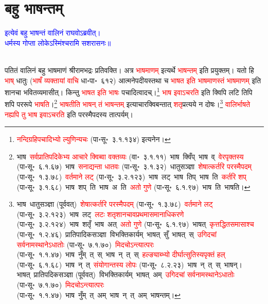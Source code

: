 \section[बहु भाषन्तम्]{बहु भाषन्तम्}
\centering\textcolor{blue}{इत्येवं बहु भाषन्तं वालिनं राघवोऽब्रवीत्।\nopagebreak\\
धर्मस्य गोप्ता लोकेऽस्मिंश्चरामि सशरासनः॥}\nopagebreak\\
\\
\begin{sloppypar}\justifying\noindent\hspace{10mm} पतितं वालिनं बहु भाषमाणं श्रीरामभद्रः प्रतिवक्ति। अत्र \textcolor{red}{भाषमाणम्} इत्यर्थे \textcolor{red}{भाषन्तम्} इति प्रयुक्तम्। यतो हि \textcolor{red}{भाष्} धातुः (\textcolor{red}{भाषँ व्यक्तायां वाचि} धा॰पा॰~६१२) आत्मनेपदीयस्तथा च \textcolor{red}{भाषत इति भाषमाणस्तं भाषमाणम्} इति शानचा भवितव्यमासीत्। किन्तु \textcolor{red}{भाषत इति भाषः} पचादित्वादच्।\footnote{\textcolor{red}{नन्दि\-ग्रहि\-पचादिभ्यो ल्युणिन्यचः} (पा॰सू॰~३.१.१३४) इत्यनेन।} \textcolor{red}{भाष इवाऽचरति}
इति क्विपि लटि तिपि शपि पररूपे \textcolor{red}{भाषति}।\footnote{भाष~\arrow \textcolor{red}{सर्वप्राति\-पदिकेभ्य आचारे क्विब्वा वक्तव्यः} (वा॰~३.१.११)~\arrow भाष~क्विँप्~\arrow भाष~व्~\arrow \textcolor{red}{वेरपृक्तस्य} (पा॰सू॰~६.१.६७)~\arrow भाष~\arrow \textcolor{red}{सनाद्यन्ता धातवः} (पा॰सू॰~३.१.३२)~\arrow धातुसञ्ज्ञा~\arrow \textcolor{red}{शेषात्कर्तरि परस्मैपदम्} (पा॰सू॰~१.३.७८)~\arrow \textcolor{red}{वर्तमाने लट्} (पा॰सू॰~३.२.१२३)~\arrow भाष~लट्~\arrow भाष~तिप्~\arrow भाष~ति~\arrow \textcolor{red}{कर्तरि शप्‌} (पा॰सू॰~३.१.६८)~\arrow भाष~शप्~ति~\arrow भाष~अ~ति~\arrow \textcolor{red}{अतो गुणे} (पा॰सू॰~६.१.९७)~\arrow भाष~ति~\arrow भाषति।} \textcolor{red}{भाषतीति भाषन् तं भाषन्तम्} इत्याचार\-क्विबन्तात् \textcolor{red}{शतृ}\-प्रत्यये न दोषः।\footnote{भाष~\arrow धातुसञ्ज्ञा (पूर्ववत्)~\arrow \textcolor{red}{शेषात्कर्तरि परस्मैपदम्} (पा॰सू॰~१.३.७८)~\arrow \textcolor{red}{वर्तमाने लट्} (पा॰सू॰~३.२.१२३)~\arrow भाष~लट्~\arrow \textcolor{red}{लटः शतृशानचावप्रथमा\-समानाधिकरणे} (पा॰सू॰~३.२.१२४)~\arrow भाष~शतृँ~\arrow भाष~अत्~\arrow \textcolor{red}{अतो गुणे} (पा॰सू॰~६.१.९७)~\arrow भाषत्~\arrow \textcolor{red}{कृत्तद्धित\-समासाश्च} (पा॰सू॰~१.२.४६)~\arrow प्रातिपादिक\-सञ्ज्ञा~\arrow विभक्ति\-कार्यम्~\arrow भाषत्~सुँ~\arrow भाषत्~स्~\arrow \textcolor{red}{उगिदचां सर्वनामस्थानेऽधातोः} (पा॰सू॰~७.१.७०)~\arrow \textcolor{red}{मिदचोऽन्त्यात्परः} (पा॰सू॰~१.१.४७)~\arrow भाष~नुँम्~त्~स्~\arrow भाष~न्~त्~स्~\arrow \textcolor{red}{हल्ङ्याब्भ्यो दीर्घात्सुतिस्यपृक्तं हल्} (पा॰सू॰~६.१.६८)~\arrow भाष~न्~त्~\arrow \textcolor{red}{संयोगान्तस्य लोपः} (पा॰सू॰~८.२.२३)~\arrow भाष~न्~त्~स्~\arrow भाषन्। भाषत्~\arrow प्रातिपदिक\-सञ्ज्ञा (पूर्ववत्)~\arrow विभक्तिकार्यम्~\arrow भाषत्~अम्~\arrow \textcolor{red}{उगिदचां सर्वनामस्थानेऽधातोः} (पा॰सू॰~७.१.७०)~\arrow \textcolor{red}{मिदचोऽन्त्यात्परः} (पा॰सू॰~१.१.४७)~\arrow भाष~नुँम्~त्~अम्~\arrow भाष~न्~त्~अम्~\arrow भाषन्तम्।} \textcolor{red}{वालिर्भाषते नह्यपि तु भाष इवाऽचरति} इति परस्मैपदस्य तात्पर्यम्।\end{sloppypar}

